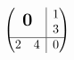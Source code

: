 \documentclass[border=2pt]{standalone}
\newcommand{\bigzero}{\mbox{\normalfont\Large\bfseries 0}}
\newcommand{\rvline}{\hspace*{-\arraycolsep}\vline\hspace*{-\arraycolsep}}
\begin{document}
$\displaystyle\begin{pmatrix}
  \bigzero
  & \rvline & \begin{matrix}1\\3\end{matrix} \\
\hline
  \begin{matrix} 2&4\end{matrix}& \rvline & 0
\end{pmatrix}$
\end{document}
